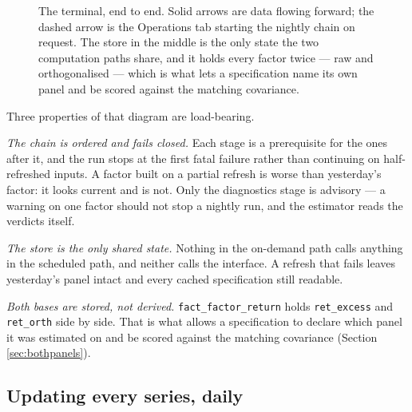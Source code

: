 \documentclass[11pt,a4paper]{article}
\newcommand{\code}[1]{\texttt{\small #1}}
\begin{document}
\begin{figure}[htbp]
{}
\caption{The terminal, end to end. Solid arrows are data flowing forward; the dashed
arrow is the Operations tab starting the nightly chain on request. The store in the
middle is the only state the two computation paths share, and it holds every factor
twice --- raw and orthogonalised --- which is what lets a specification name its own
panel and be scored against the matching covariance.}
\label{fig:flow}
\end{figure}

Three properties of that diagram are load-bearing.

\emph{The chain is ordered and fails closed.} Each stage is a prerequisite for the
ones after it, and the run stops at the first fatal failure rather than continuing
on half-refreshed inputs. A factor built on a partial refresh is worse than
yesterday's factor: it looks current and is not. Only the diagnostics stage is
advisory --- a warning on one factor should not stop a nightly run, and the
estimator reads the verdicts itself.

\emph{The store is the only shared state.} Nothing in the on-demand path calls
anything in the scheduled path, and neither calls the interface. A refresh that
fails leaves yesterday's panel intact and every cached specification still readable.

\emph{Both bases are stored, not derived.} \code{fact\_factor\_return} holds
\code{ret\_excess} and \code{ret\_orth} side by side. That is what allows a
specification to declare which panel it was estimated on and be scored against the
matching covariance (Section \ref{sec:bothpanels}).

\subsection{Updating every series, daily}
\label{sec:daily}
\end{document}
